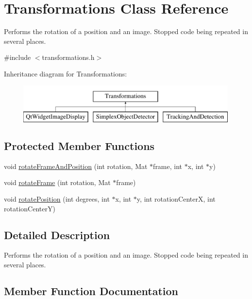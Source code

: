 \hypertarget{class_transformations}{}\section{Transformations Class Reference}
\label{class_transformations}


Performs the rotation of a position and an image. Stopped code being repeated in several places.  




{\ttfamily \#include $<$transformations.\+h$>$}

Inheritance diagram for Transformations\+:\begin{figure}[H]
\begin{center}
\leavevmode
\includegraphics[height=2.000000cm]{class_transformations}
\end{center}
\end{figure}
\subsection*{Protected Member Functions}
\begin{DoxyCompactItemize}
\item 
void \hyperlink{class_transformations_ad7854509a197c02fe33df60cda622c11}{rotate\+Frame\+And\+Position} (int rotation, Mat $\ast$frame, int $\ast$x, int $\ast$y)
\item 
void \hyperlink{class_transformations_a9225a5452e0a3943fe7f91024538d5c3}{rotate\+Frame} (int rotation, Mat $\ast$frame)
\item 
void \hyperlink{class_transformations_a2f3d48d1535caddb0af4b619e9bce694}{rotate\+Position} (int degrees, int $\ast$x, int $\ast$y, int rotation\+Center\+X, int rotation\+Center\+Y)
\end{DoxyCompactItemize}


\subsection{Detailed Description}
Performs the rotation of a position and an image. Stopped code being repeated in several places. 

\subsection{Member Function Documentation}
\hypertarget{class_transformations_a9225a5452e0a3943fe7f91024538d5c3}{}

